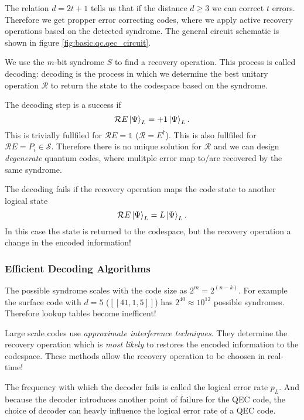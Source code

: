 The relation $d = 2t+1$ tells us that if the distance $d\ge 3$ we can correct $t$ errors.
Therefore we get propper error correcting codes, where we apply active recovery operations based on the detected syndrome.
The general circuit schematic is shown in figure \ref{fig:basic.qc.qec_circuit}. \cite{QECintro}

We use the $m$-bit syndrome $S$ to find a recovery operation. 
This process is called decoding: 
decoding is the process in which we determine the best unitary operation $\mathcal{R}$ to return the state to the codespace based on the syndrome. \cite{QECintro}

The decoding step is a success if 
\begin{equation}
    \mathcal{R}E \ket{\Psi}_L = +1 \ket{\Psi}_L.
\end{equation}
This is trivially fullfiled for $\mathcal{R}E=\mathds{1}$ ($\mathcal{R}=E^\dagger$). 
This is also fullfiled for $\mathcal{R}E=P_i \in \mathcal{S}$.
Therefore there is no unique solution for $\mathcal{R}$ and we can design \textit{degenerate} quantum codes,
where mulitple error map to/are recovered by the same syndrome. \cite{QECintro}

The decoding fails if the recovery operation maps the code state to another logical state
\begin{equation}
    \mathcal{R}E \ket{\Psi}_L = L\ket{\Psi}_L.
\end{equation}
In this case the state is returned to the codespace, 
but the recovery operation a change in the encoded information! \cite{QECintro}

\subsubsection{Efficient Decoding Algorithms}

The possible syndrome scales with the code size as $2^m = 2^(n-k)$.
For example the surface code with $d=5$ ($[[41,1,5]]$) has $2^40\approx 10^12$ possible syndromes. 
Therefore lookup tables become inefficent! \cite{QECintro}

Large scale codes use \textit{approximate interference techniques}.
They determine the recovery operation which is \textit{most likely} to restores the encoded information to the codespace.
These methods allow the recovery operation to be choosen in real-time! \cite{QECintro}

The frequency with which the decoder fails is called the logical error rate $p_L$. 
And because the decoder introduces another point of failure for the QEC code, the choice of decoder can heavly influence the logical error rate of a QEC code.  \cite{QECintro}

